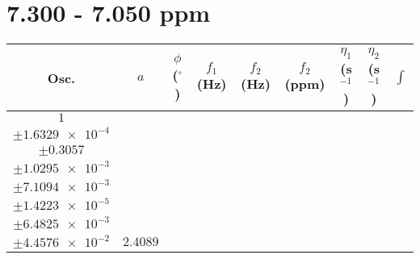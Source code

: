 \documentclass[8pt]{article}
\begin{document}
\section*{7.300 - 7.050 ppm}
\begin{longtable}[l]{c c c c c c c c c}
\toprule
Osc. & $a$ & $\phi$ ($^{\circ}$) & $f_1$ (Hz) & $f_2$ (Hz) & $f_2$ (ppm) & $\eta_1$ (s$^{-1}$) & $\eta_2$ (s$^{-1}$) & $\int$\\
\midrule
$\num{1}$ & \begin{tabular}[c]{@{}c@{}}$\num{3.0074e-2}$ \\ $\pm\num{1.6329e-4}$\end{tabular} & \begin{tabular}[c]{@{}c@{}}$\num{-7.9415e-2}$ \\ $\pm\num{0.3057}$\end{tabular} & \begin{tabular}[c]{@{}c@{}}$\num{-7.9111}$ \\ $\pm\num{1.0295e-3}$\end{tabular} & \begin{tabular}[c]{@{}c@{}}$\num{3.5395e+3}$ \\ $\pm\num{7.1094e-3}$\end{tabular} & \begin{tabular}[c]{@{}c@{}}$\num{7.081}$ \\ $\pm\num{1.4223e-5}$\end{tabular} & \begin{tabular}[c]{@{}c@{}}$\num{1.1776}$ \\ $\pm\num{6.4825e-3}$\end{tabular} & \begin{tabular}[c]{@{}c@{}}$\num{4.3932}$ \\ $\pm\num{4.4576e-2}$\end{tabular} & $\num{2.4089}$\\

\end{longtable}
\end{document}
